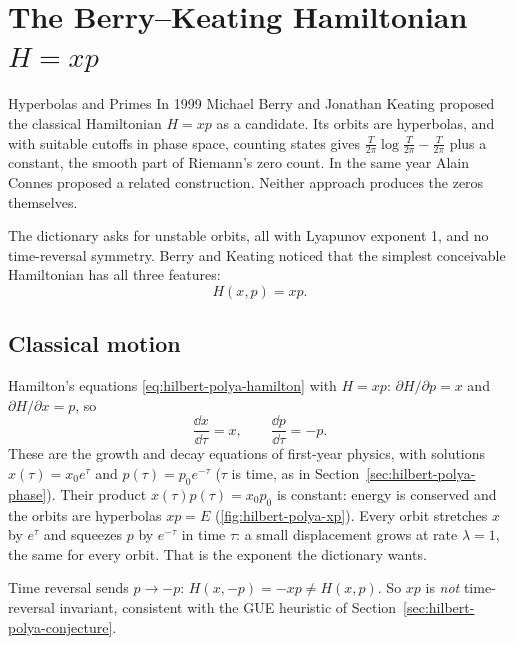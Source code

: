 \section{The Berry--Keating Hamiltonian \texorpdfstring{$H=xp$}{H = xp}}\label{sec:hilbert-polya-xp}
\begin{didyouknow}{Hyperbolas and Primes}
In 1999 Michael Berry and Jonathan Keating proposed the classical Hamiltonian $H=xp$ as a candidate. Its orbits are hyperbolas, and with suitable cutoffs in phase space, counting states gives $\frac{T}{2\pi}\log\frac{T}{2\pi}-\frac{T}{2\pi}$ plus a constant, the smooth part of Riemann's zero count. In the same year Alain Connes proposed a related construction. Neither approach produces the zeros themselves.
\end{didyouknow}

The dictionary asks for unstable orbits, all with Lyapunov exponent 1, and no time-reversal symmetry. Berry and Keating \cite{berrykeating99} noticed that the simplest conceivable Hamiltonian has all three features:
\begin{equation}
H(x,p)=xp .
\label{eq:hilbert-polya-xp}
\end{equation}

\subsection{Classical motion}

Hamilton's equations \eqref{eq:hilbert-polya-hamilton} with $H=xp$: $\partial H/\partial p=x$ and $\partial H/\partial x=p$, so
\begin{equation}
\frac{\dd x}{\dd \tau}=x,\qquad\frac{\dd p}{\dd \tau}=-p .
\end{equation}
These are the growth and decay equations of first-year physics, with solutions $x(\tau)=x_0e^{\tau}$ and $p(\tau)=p_0e^{-\tau}$ ($\tau$ is time, as in Section~\ref{sec:hilbert-polya-phase}). Their product $x(\tau)p(\tau)=x_0p_0$ is constant: energy is conserved and the orbits are hyperbolas $xp=E$ (\cref{fig:hilbert-polya-xp}). Every orbit stretches $x$ by $e^\tau$ and squeezes $p$ by $e^{-\tau}$ in time $\tau$: a small displacement grows at rate $\lambda=1$, the same for every orbit. That is the exponent the dictionary wants.

Time reversal sends $p\to-p$: $H(x,-p)=-xp\ne H(x,p)$. So $xp$ is \emph{not} time-reversal invariant, consistent with the GUE heuristic of Section~\ref{sec:hilbert-polya-conjecture}.

